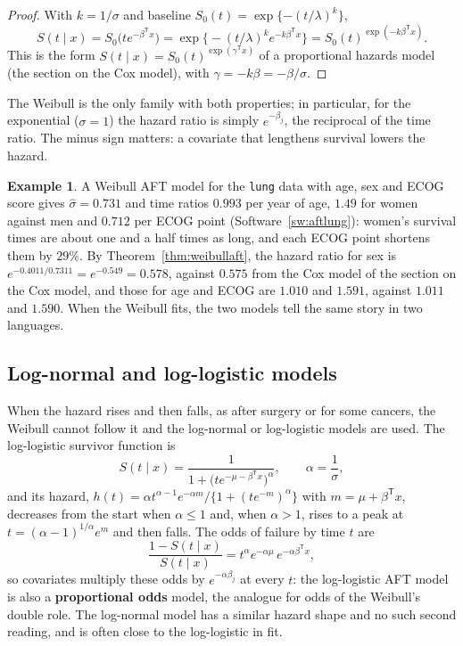 \documentclass[11pt,a4paper]{article}
\numberwithin{equation}{section}
\theoremstyle{definition}
\newtheorem{exa}[thm]{Example}
\begin{document}
\begin{proof}
With $k = 1/\sigma$ and baseline $S_0(t) = \exp\{-(t/\lambda)^k\}$,
\[
S(t \mid x) = S_0\big(te^{-\beta^{\mathsf T}x}\big) = \exp\big\{-(t/\lambda)^ke^{-k\beta^{\mathsf T}x}\big\} = S_0(t)^{\exp(-k\beta^{\mathsf T}x)} .
\]
This is the form $S(t\mid x) = S_0(t)^{\exp(\gamma^{\mathsf T}x)}$ of a proportional hazards model (the section on the Cox model), with $\gamma = -k\beta = -\beta/\sigma$.
\end{proof}

The Weibull is the only family with both properties; in particular, for the exponential ($\sigma = 1$) the hazard ratio is simply $e^{-\beta_j}$, the reciprocal of the time ratio. The minus sign matters: a covariate that lengthens survival lowers the hazard.

\begin{exa}
\label{ex:aftlung}
A Weibull AFT model for the \texttt{lung} data with age, sex and ECOG score gives $\hat\sigma = 0.731$ and time ratios $0.993$ per year of age, $1.49$ for women against men and $0.712$ per ECOG point (Software~\ref{sw:aftlung}): women's survival times are about one and a half times as long, and each ECOG point shortens them by $29\%$. By Theorem~\ref{thm:weibullaft}, the hazard ratio for sex is
$e^{-0.4011/0.7311} = e^{-0.549} = 0.578$, against $0.575$ from the Cox model of the section on the Cox model, and those for age and ECOG are $1.010$ and $1.591$, against $1.011$ and $1.590$. When the Weibull fits, the two models tell the same story in two languages.
\end{exa}

\subsection{Log-normal and log-logistic models}
\label{ssec:aftother}

When the hazard rises and then falls, as after surgery or for some cancers, the Weibull cannot follow it and the log-normal or log-logistic models are used. The log-logistic survivor function is
\[
S(t \mid x) = \frac{1}{1 + \big(te^{-\mu - \beta^{\mathsf T}x}\big)^{\alpha}} , \qquad \alpha = \frac1\sigma ,
\]
and its hazard, $h(t) = \alpha t^{\alpha-1}e^{-\alpha m}/\{1 + (te^{-m})^{\alpha}\}$ with $m = \mu + \beta^{\mathsf T}x$, decreases from the start when $\alpha \le 1$ and, when $\alpha > 1$, rises to a peak at $t = (\alpha - 1)^{1/\alpha}e^{m}$ and then falls. The odds of failure by time $t$ are
\[
\frac{1 - S(t \mid x)}{S(t \mid x)} = t^{\alpha}e^{-\alpha\mu}\,e^{-\alpha\beta^{\mathsf T}x} ,
\]
so covariates multiply these odds by $e^{-\alpha\beta_j}$ at every $t$: the log-logistic AFT model is also a \textbf{proportional odds} model, the analogue for odds of the Weibull's double role. The log-normal model has a similar hazard shape and no such second reading, and is often close to the log-logistic in fit.
\end{document}
